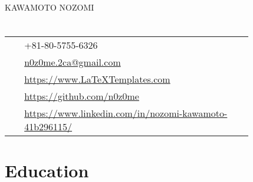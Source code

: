 \documentclass[10pt]{article} %
\begin{document}

\parbox[top][0.12\textheight][c]{\linewidth}{ %
	\vspace{-0.04\textheight} %
	{\sffamily\Huge KAWAMOTO NOZOMI}\\\medskip %
}

\begin{paracol}{2} %


\section{}
\parbox[top][0.12\textheight][c]{\linewidth}{ %
	\vspace{-0.04\textheight} %
	\colorbox{shade}{ %
		\begin{supertabular}{p{0.05\linewidth}|p{0.775\linewidth}} %
			\raisebox{-1pt}{\faPhone} & +81-80-5755-6326 \\ %
			\raisebox{0pt}{\small\faEnvelope} & \href{mailto:n0z0me.2ca@gmail.com}{n0z0me.2ca@gmail.com} \\ %
			\raisebox{-1pt}{\small\faDesktop} & \href{https://www.LaTeXTemplates.com}{https://www.LaTeXTemplates.com} \\ %
			\raisebox{-1pt}{\faGithub} & \href{https://github.com/n0z0me}{https://github.com/n0z0me} \\ %
			\raisebox{-1pt}{\faLinkedinSquare} & \href{https://www.linkedin.com/in/nozomi-kawamoto-41b296115/}{https://www.linkedin.com/in/nozomi-kawamoto-41b296115/} \\ %
		\end{supertabular}
	}
}

\section{Education}

\end{paracol}
\end{document}
